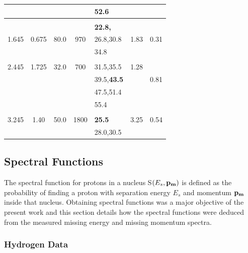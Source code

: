 \documentclass[aps,prl,twocolumn,showpacs,amsmath,amssymb,floats]{revtex4}
\begin{document}
\begin{table}
\begin{center}
\begin{tabular}{|c|c|c|c|l|c|c|}
       &         &         &        & 52.6      &          &         \\ \hline
       &         &         &        &           &          &         \\
       &         &         &        & \bf{22.8},&          &         \\
 1.645 & 0.675   & 80.0    &  970   & 26.8,30.8 & 1.83     & 0.31    \\
       &         &         &        & 34.8      &          &         \\ \hline 
       &         &         &        &           &          &         \\
 2.445 & 1.725   & 32.0    &  700   & 31.5,35.5 & 1.28     &         \\
       &         &         &        & 39.5,\bf{43.5}&      & 0.81    \\
       &         &         &        & 47.5,51.4 &          &         \\
       &         &         &        & 55.4      &          &         \\ \hline
       &         &         &        &           &          &         \\
 3.245 & 1.40    & 50.0    & 1800   & \bf{25.5} & 3.25     & 0.54    \\
       &         &         &        & 28.0,30.5 &          &         \\ \hline 
\hline
\end{tabular}
\end{center}
\end{table}

 
\subsection*{Spectral Functions}

The spectral function for protons in a nucleus S$(E_s, \bf{p}_m)$ is defined as 
the probability of finding a proton with separation energy $E_s$ and momentum 
$\bf{p}_m$ inside that nucleus.  Obtaining spectral functions was a major 
objective of the present work and this section details how the spectral 
functions were deduced from the measured missing energy and missing momentum 
spectra.

\subsubsection*{Hydrogen Data}
\end{document}
